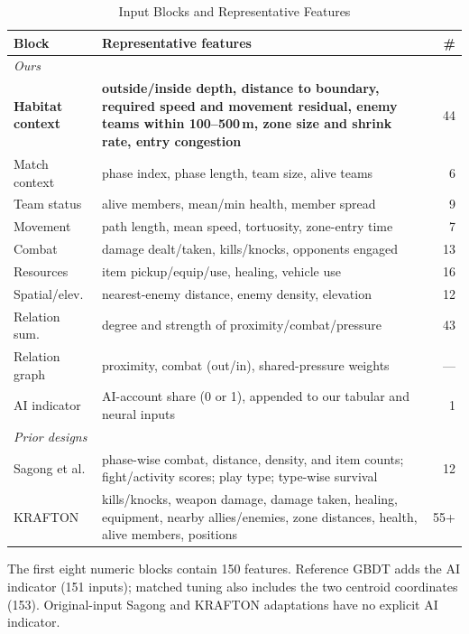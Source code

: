 \documentclass[sigconf,anonymous,nonacm]{acmart}
\begin{document}
\begin{table}[t]
\centering
\caption{Input Blocks and Representative Features}
\label{tab:blocks}
\footnotesize
\setlength{\tabcolsep}{3pt}
\begin{tabular}{p{1.45cm}p{5.8cm}r}
\hline
Block & Representative features & \# \\
\hline
\multicolumn{3}{l}{\emph{Ours}} \\
\textbf{Habitat context} & \textbf{outside/inside depth, distance to boundary, required speed and movement residual, enemy teams within 100--500\,m, zone size and shrink rate, entry congestion} & 44 \\
Match context & phase index, phase length, team size, alive teams & 6 \\
Team status & alive members, mean/min health, member spread & 9 \\
Movement & path length, mean speed, tortuosity, zone-entry time & 7 \\
Combat & damage dealt/taken, kills/knocks, opponents engaged & 13 \\
Resources & item pickup/equip/use, healing, vehicle use & 16 \\
Spatial/elev. & nearest-enemy distance, enemy density, elevation & 12 \\
Relation sum. & degree and strength of proximity/combat/pressure & 43 \\
Relation graph & proximity, combat (out/in), shared-pressure weights & --- \\
AI indicator & AI-account share (0 or 1), appended to our tabular and neural inputs & 1 \\
\hline
\multicolumn{3}{l}{\emph{Prior designs}} \\
Sagong et al. & phase-wise combat, distance, density, and item counts; fight/activity scores; play type; type-wise survival & 12 \\
KRAFTON & kills/knocks, weapon damage, damage taken, healing, equipment, nearby allies/enemies, zone distances, health, alive members, positions & 55+ \\
\hline
\end{tabular}
\smallskip
\parbox{\columnwidth}{\scriptsize The first eight numeric blocks contain 150 features. Reference GBDT adds the AI indicator (151 inputs); matched tuning also includes the two centroid coordinates (153). Original-input Sagong and KRAFTON adaptations have no explicit AI indicator.}
\end{table}
\end{document}
